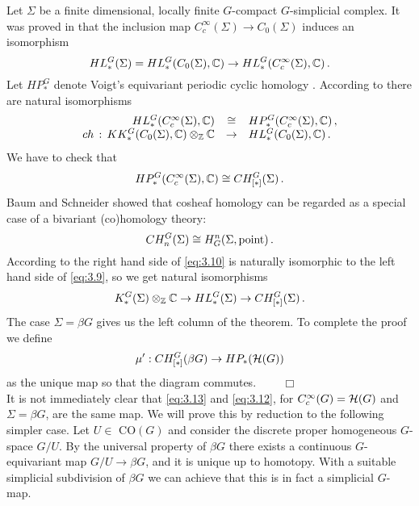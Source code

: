 Let $\Sigma$ be a finite dimensional, locally finite $G$-compact 
$G$-simplicial complex.
It was proved in \cite[Proposition 10.4]{Voi3} that the inclusion map
$C_c^\infty (\Sigma) \to C_0 (\Sigma)$ induces an isomorphism
\[
HL^G_* (\Sigma) =  HL_*^G (C_0 (\Sigma),\mathbb C ) \to
HL_*^G (C_c^\infty (\Sigma),\mathbb C ) \,.
\]
Let $HP_*^G$ denote Voigt's equivariant periodic cyclic homology \cite[Section 3]{Voi2}. 
According to \cite[Section 6]{Voi4} there are natural isomorphisms
\[
\begin{array}{rcl}
HL_*^G (C_c^\infty (\Sigma),\mathbb C ) & \cong & HP_*^G (C_c^\infty (\Sigma),\mathbb C ) \,, \\
ch \,:\, KK_*^G (C_0 (\Sigma) ,\mathbb C ) \otimes_{\mathbb Z} \mathbb C & \to & 
 HL_*^G (C_0 (\Sigma) ,\mathbb C ) \,.
\end{array}
\]
We have to check that
\begin{equation}\label{eq:3.9}
HP_*^G (C_c^\infty (\Sigma) ,\mathbb C ) \cong CH_{[*]}^G (\Sigma) \,.
\end{equation}
Baum and Schneider \cite[Section 1.B]{BaSc} showed that cosheaf homology 
can be regarded as a special case of a bivariant (co)homology theory:
\begin{equation}\label{eq:3.10}
CH_n^G (\Sigma) \cong H^n_G (\Sigma, \mathrm{point}) \,.
\end{equation}
According to \cite{Voi2} the right hand side of \eqref{eq:3.10} is naturally
isomorphic to the left hand side of \eqref{eq:3.9}, so we get natural isomorphisms
\begin{equation}\label{eq:3.31}
K_*^G (\Sigma ) \otimes_{\mathbb Z} \mathbb C \to HL_*^G (\Sigma ) \to CH_{[*]}^G (\Sigma ) \,.
\end{equation}
The case $\Sigma = \beta G$ gives us the left column of the theorem. 
To complete the proof we define 
\begin{equation}\label{eq:3.13}
\mu' : CH^G_{[*]} (\beta G) \to HP_* (\mathcal H (G))
\end{equation}
as the unique map so that the diagram commutes. $\qquad \Box$
\\[2mm]

It is not immediately clear that \eqref{eq:3.13} and \eqref{eq:3.12}, for
$C_c^\infty (G) = \mathcal H (G)$ and $\Sigma = \beta G$, are the same map. 
We will prove this by reduction to the following simpler case.
Let $U \in$ CO$ (G)$ and consider the discrete proper homogeneous
$G$-space  $G/U$. By the universal property of $\beta G$ there exists
a continuous $G$-equivariant map $G/U \to \beta G$, and it is unique
up to homotopy. With a suitable simplicial subdivision of $\beta G$ we can
achieve that this is in fact a simplicial $G$-map.

